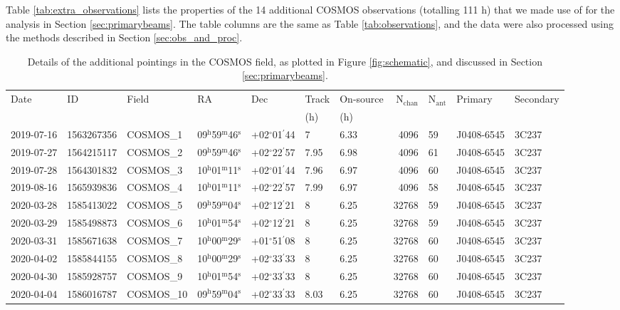 \documentclass[usenatbib,usedcolumn]{mnras}
\newcommand{\hhh}{$^{\mathrm{h}}$}
\newcommand{\mmm}{$^{\mathrm{m}}$}
\newcommand{\sss}{$^{\mathrm{s}}$}
\newcommand{\ddd}{$^{\mathrm{\circ}}$}
\newcommand{\dmm}{$^{\prime}$}
\begin{document}
Table \ref{tab:extra_observations} lists the properties of the 14 additional COSMOS observations (totalling 111 h) that we made use of for the analysis in Section \ref{sec:primarybeams}. The table columns are the same as Table \ref{tab:observations}, and the data were also processed using the methods described in Section \ref{sec:obs_and_proc}.

\begin{table*}
\begin{minipage}{176mm}
\centering
\caption{Details of the additional pointings in the COSMOS field, as plotted in Figure \ref{fig:schematic}, and discussed in Section \ref{sec:primarybeams}.}
\begin{tabular}{lllllllrlll} \hline
Date       & ID         & Field  & RA          & Dec        & Track   & On-source & N$_{\mathrm{chan}}$ & N$_{\mathrm{ant}}$ & Primary & Secondary \\ 
           &            &        &             &            & (h) & (h)   &                     &                    & \\ \hline
2019-07-16&	1563267356&	COSMOS\_1&	09\hhh59\mmm46\sss&	+02\ddd01\dmm44\farcs6&	7	&   6.33&	4096	&59&	J0408-6545&	3C237\\
2019-07-27&	1564215117&	COSMOS\_2&	09\hhh59\mmm46\sss&	+02\ddd22\dmm57\farcs4&	7.95&	6.98&	4096	&61&	J0408-6545&	3C237\\
2019-07-28&	1564301832&	COSMOS\_3&	10\hhh01\mmm11\sss&	+02\ddd01\dmm44\farcs6&	7.96&	6.97&	4096	&60&	J0408-6545&	3C237\\
2019-08-16&	1565939836&	COSMOS\_4&	10\hhh01\mmm11\sss&	+02\ddd22\dmm57\farcs4&	7.99&	6.97&	4096	&58&	J0408-6545&	3C237\\
2020-03-28&	1585413022&	COSMOS\_5&	09\hhh59\mmm04\sss&	+02\ddd12\dmm21\farcs0&	8	&   6.25&	32768	&59&	J0408-6545&	3C237\\
2020-03-29&	1585498873&	COSMOS\_6&	10\hhh01\mmm54\sss&	+02\ddd12\dmm21\farcs0&	8	&   6.25&	32768	&59&	J0408-6545&	3C237\\
2020-03-31&	1585671638&	COSMOS\_7&	10\hhh00\mmm29\sss&	+01\ddd51\dmm08\farcs2&	8	&   6.25&	32768	&60&	J0408-6545&	3C237\\
2020-04-02&	1585844155&	COSMOS\_8&	10\hhh00\mmm29\sss&	+02\ddd33\dmm33\farcs8&	8	&   6.25&	32768	&60&	J0408-6545&	3C237\\
2020-04-30&	1585928757&	COSMOS\_9&	10\hhh01\mmm54\sss&	+02\ddd33\dmm33\farcs8&	8	&   6.25&	32768	&60&	J0408-6545&	3C237\\
2020-04-04&	1586016787&	COSMOS\_10&	09\hhh59\mmm04\sss&	+02\ddd33\dmm33\farcs8&	8.03&	6.25&	32768	&60&	J0408-6545&	3C237\\

\end{tabular}
\end{minipage}
\end{table*}
\end{document}
